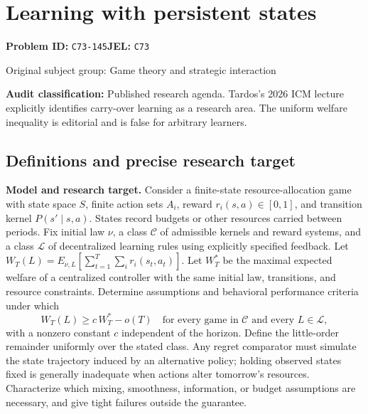 \documentclass[11pt,a4paper]{article}
\begin{document}
\section*{Learning with persistent states}
\textbf{Problem ID:} \texttt{C73-145}\quad \textbf{JEL:} \texttt{C73}\par
\label{problem:OP-0285}
{\sffamily\small\color{muted}Original subject group: Game theory and strategic interaction\par}
\label{definitions:problem:30007567}
\textbf{Audit classification:} Published research agenda. Tardos’s 2026 ICM lecture explicitly identifies carry-over learning as a research area. The uniform welfare inequality is editorial and is false for arbitrary learners.
\subsection*{Definitions and precise research target}
\textbf{Model and research target.} Consider a finite-state resource-allocation game with state space \(S\), finite action sets \(A_i\), reward \(r_i(s,a)\in[0,1]\), and transition kernel \(P(s'\mid s,a)\). States record budgets or other resources carried between periods. Fix initial law \(\nu\), a class \(\mathcal C\) of admissible kernels and reward systems, and a class \(\mathcal L\) of decentralized learning rules using explicitly specified feedback. Let \(W_T(L)=E_{\nu,L}[\sum_{t=1}^T\sum_i r_i(s_t,a_t)]\). Let \(W_T^*\) be the maximal expected welfare of a centralized controller with the same initial law, transitions, and resource constraints. Determine assumptions and behavioral performance criteria under which
\[
 W_T(L)\geq c\,W_T^*-o(T)
 \quad\text{for every game in }\mathcal C\text{ and every }L\in\mathcal L,
\]
with a nonzero constant \(c\) independent of the horizon. Define the little-order remainder uniformly over the stated class. Any regret comparator must simulate the state trajectory induced by an alternative policy; holding observed states fixed is generally inadequate when actions alter tomorrow's resources. Characterize which mixing, smoothness, information, or budget assumptions are necessary, and give tight failures outside the guarantee.
\end{document}
